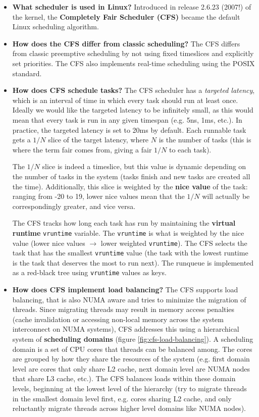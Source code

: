 \documentclass[12pt]{article}
\begin{document}
\begin{itemize}
    \item \textbf{What scheduler is used in Linux?} Introduced in release 2.6.23 (2007!) of the kernel, the \textbf{Completely Fair Scheduler (CFS)} became the default Linux scheduling algorithm.
    \item \textbf{How does the CFS differ from classic scheduling?} The CFS differs from classic preemptive scheduling by not using fixed timeslices and explicitly set priorities. The CFS also implements real-time scheduling using the POSIX standard.
    \item \textbf{How does CFS schedule tasks?} The CFS scheduler has a \textit{targeted latency}, which is an interval of time in which every task should run at least once. Ideally we would like the targeted latency to be infinitely small, as this would mean that every task is run in any given timespan (e.g. 5ns, 1ms, etc.). In practice, the targeted latency is set to 20ms by default. Each runnable task gets a \(1/N\) slice of the target latency, where \(N\) is the number of tasks (this is where the term fair comes from, giving a fair \(1/N\) to each task). \begin{sloppypar} The \(1/N\) slice is indeed a timeslice, but this value is dynamic depending on the number of tasks in the system (tasks finish and new tasks are created all the time). Additionally, this slice is weighted by the \textbf{nice value} of the task: ranging from -20 to 19, lower nice values mean that the \(1/N\) will actually be correspondingly greater, and vice versa. \end{sloppypar} \begin{sloppypar} The CFS tracks how long each task has run by maintaining the \textbf{virtual runtime} \texttt{vruntime} variable. The \texttt{vruntime} is what is weighted by the nice value (lower nice values \(\rightarrow\) lower weighted \texttt{vruntime}). The CFS selects the task that has the smallest \texttt{vruntime} value (the task with the lowest runtime is the task that deserves the most to run next). The runqueue is implemented as a red-black tree using \texttt{vruntime} values as keys. \end{sloppypar} 
    \item \textbf{How does CFS implement load balancing?} The CFS supports load balancing, that is also NUMA aware and tries to minimize the migration of threads. Since migrating threads may result in memory access penalties (cache invalidation or accessing non-local memory across the system interconnect on NUMA systems), CFS addresses this using a hierarchical system of \textbf{scheduling domains} (figure \ref{fig:cfs-load-balancing}). A scheduling domain is a set of CPU cores that threads can be balanced among. The cores are grouped by how they share the resources of the system (e.g. first domain level are cores that only share L2 cache, next domain level are NUMA nodes that share L3 cache, etc.). The CFS balances loads within these domain levels, beginning at the lowest level of the hierarchy (try to migrate threads in the smallest domain level first, e.g. cores sharing L2 cache, and only reluctantly migrate threads across higher level domains like NUMA nodes).

\end{itemize}
\end{document}
